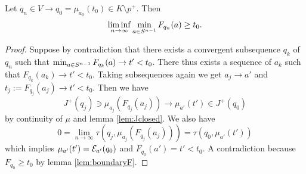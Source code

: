 \begin{lemma}
    Let $q_n\in V\to q_0=\mu_{a_0}(t_0)\in K\setminus p^+$. Then 
    \[
        \liminf_{n\to \infty} \min_{a \in {S^{n-1}}} F_{q_n}(a) \ge t_0.
    \]
\end{lemma}
\begin{proof}
    Suppose by contradiction that there exists a convergent subsequence $q_k$ of $q_n$ such that $\min_{a \in {S^{n-1}}} F_{q_k}(a)\to t'<t_0$. There thus exists a sequence of $a_k$ such that $F_{q_k}(a_k)\to t'<t_0$. Taking subsequences again we get $a_j\to a'$ and $t_j:=F_{q_j}(a_j)\to t'<t_0$. Then we have 
    \[
        J^+(q_j)\ni \mu_{a_j}(F_{q_j}(a_j)) \to \mu_{a'}(t') \in J^+(q_0)
    \] by continuity of $\mu$ and lemma \ref{lem:Jclosed}. We also have 
    \[
        0 = \lim_{n\to \infty}\tau(q_j,\mu_{a_j}(F_{q_j}(a_j))) = \tau(q_0,\mu_{a'}(t'))
    \] which implies $\mu_{a'}(t')={\mathcal{E}}_{a'}(q_0)$ and $F_{q_0}(a')=t'<t_0$. A contradiction because $F_{q_0}\ge t_0$ by lemma \ref{lem:boundaryF}.
\end{proof}

